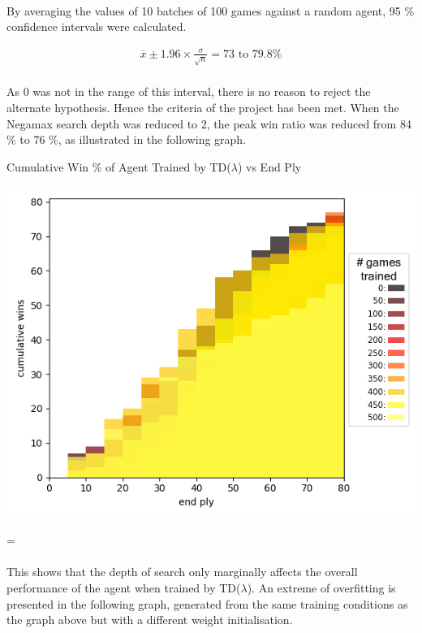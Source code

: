 \documentclass[12pt,a4paper]{book}
\newenvironment{absolutelynopagebreak}
{\par\nobreak\vfil\penalty0\vfilneg
  \vtop\bgroup}
{\par\xdef\tpd{\the\prevdepth}\egroup
  \prevdepth=\tpd}
\begin{document}
\paragraph{} By averaging the values of 10 batches of 100 games against a random agent, 95 \% confidence intervals were calculated. 

\begin{align*}
  \overline{x} \pm 1.96 \times \frac{\sigma}{\sqrt{n}} = 73 \text{ to } 79.8 \%
\end{align*}

\paragraph{} As 0 was not in the range of this interval, there is no reason to reject the alternate hypothesis. Hence the criteria of the project has been met. When the Negamax search depth was reduced to 2, the peak win ratio was reduced from 84 \% to 76 \%, as illustrated in the following graph.

\begin{absolutelynopagebreak}
\begin{center}
  \centerline{Cumulative Win \% of Agent Trained by TD($\lambda$) vs End Ply}
  \includegraphics[scale=0.5]{lambdagood.png}
\end{center}
\end{absolutelynopagebreak}

\paragraph{} This shows that the depth of search only marginally affects the overall performance of the agent when trained by TD($\lambda$). An extreme of overfitting is presented in the following graph, generated from the same training conditions as the graph above but with a different weight initialisation.
\end{document}
